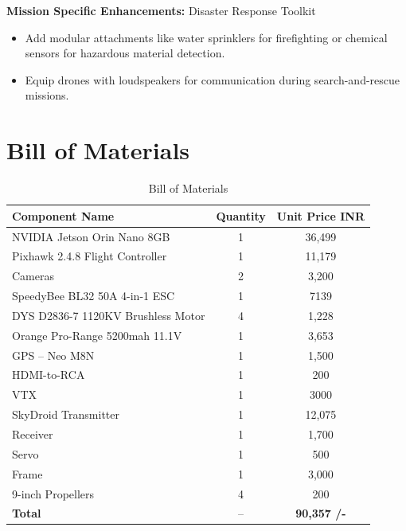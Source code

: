 \documentclass[12pt]{report}
\begin{document}
    \noindent \textbf{Mission Specific Enhancements:} Disaster Response Toolkit 
    \begin{itemize}
      \item Add modular attachments like water sprinklers for firefighting or chemical sensors for hazardous material detection.
      \item Equip drones with loudspeakers for communication during search-and-rescue missions.
    \end{itemize}

  \chapter{Bill of Materials}
    \begin{table}[h!]
      \centering
      \caption{Bill of Materials} \vspace{0.2cm}
        \begin{tabular}{|l|c|c|}
          \hline
          \textbf{Component Name} & \textbf{Quantity} & \textbf{Unit Price {INR}} \\
          \hline
          NVIDIA Jetson Orin Nano 8GB & 1 & 36,499 \\
          Pixhawk 2.4.8 Flight Controller & 1 & 11,179 \\
          Cameras & 2 & 3,200 \\
          SpeedyBee BL32 50A 4-in-1 ESC &1 &7139\\
          DYS D2836-7 1120KV Brushless Motor &4 &1,228\\
          Orange Pro-Range 5200mah 11.1V & 1 &3,653\\
          GPS – Neo M8N  &1 &1,500\\
          HDMI-to-RCA & 1 & 200 \\
          VTX & 1 & 3000 \\
          SkyDroid Transmitter  &1 & 12,075\\
          Receiver & 1 & 1,700 \\
          Servo & 1 & 500\\
          Frame  &1& 3,000\\
          9-inch Propellers & 4 &200\\
          \hline
          \textbf{Total}  & --  & \textbf{90,357 /-}   \\      
          \hline
        \end{tabular}
    \end{table}
\end{document}
